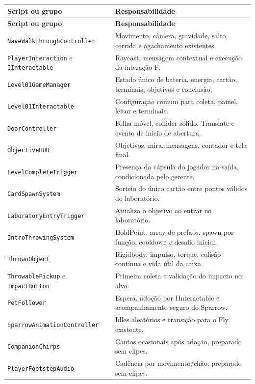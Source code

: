 \documentclass[12pt,a4paper]{article}
\begin{document}
\small
\begin{longtable}{|p{6.3cm}|p{8.7cm}|}
\hline
\textbf{Script ou grupo} & \textbf{Responsabilidade}\\
\hline
\endfirsthead
\hline
\textbf{Script ou grupo} & \textbf{Responsabilidade}\\
\hline
\endhead
\texttt{NaveWalkthroughController} & Movimento, câmera, gravidade, salto, corrida e agachamento existentes.\\
\hline
\texttt{PlayerInteraction} e \texttt{IInteractable} & Raycast, mensagem contextual e execução da interação F.\\
\hline
\texttt{Level01GameManager} & Estado único de bateria, energia, cartão, terminais, objetivos e conclusão.\\
\hline
\texttt{Level01Interactable} & Configuração comum para coleta, painel, leitor e terminais.\\
\hline
\texttt{DoorController} & Folha móvel, collider sólido, Translate e evento de início de abertura.\\
\hline
\texttt{ObjectiveHUD} & Objetivos, mira, mensagens, contador e tela final.\\
\hline
\texttt{LevelCompleteTrigger} & Presença da cápsula do jogador na saída, condicionada pelo gerente.\\
\hline
\texttt{CardSpawnSystem} & Sorteio do único cartão entre pontos válidos do laboratório.\\
\hline
\texttt{LaboratoryEntryTrigger} & Atualiza o objetivo ao entrar no laboratório.\\
\hline
\texttt{IntroThrowingSystem} & HoldPoint, array de prefabs, spawn por função, cooldown e desafio inicial.\\
\hline
\texttt{ThrownObject} & Rigidbody, impulso, torque, colisão contínua e vida útil da caixa.\\
\hline
\texttt{ThrowablePickup} e \texttt{ImpactButton} & Primeira coleta e validação do impacto no alvo.\\
\hline
\texttt{PetFollower} & Espera, adoção por IInteractable e acompanhamento seguro do Sparrow.\\
\hline
\texttt{SparrowAnimationController} & Idles aleatórios e transição para o Fly existente.\\
\hline
\texttt{CompanionChirps} & Cantos ocasionais após adoção, preparado sem clipes.\\
\hline
\texttt{PlayerFootstepAudio} & Cadência por movimento/chão, preparado sem clipes.\\
\hline

\end{longtable}
\end{document}
